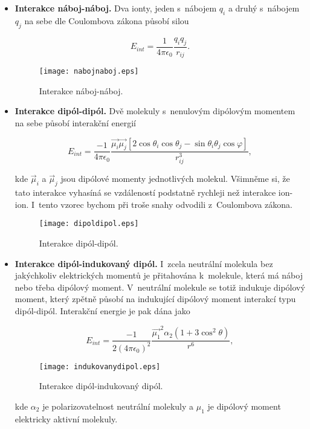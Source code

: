\begin{itemize} 

\item \textbf{Interakce náboj-náboj.} Dva ionty, jeden s~nábojem $q_i$ a druhý s~nábojem $q_j$ na sebe dle Coulombova zákona působí silou

\begin{equation}
E_{int} = \frac{1}{4 \pi \epsilon_0} \frac{q_i q_j}{r_{ij}}.
\label{rov:MS-1}
\end{equation}

\begin{figure} [htb]
\centering
\texttt{[image: nabojnaboj.eps]}
\caption{Interakce náboj-náboj.}
\label{obr:Naboj-Naboj}
\end{figure}

\item \textbf{Interakce dipól-dipól.} Dvě molekuly s~nenulovým dipólovým momentem na sebe působí interakční energií

\begin{equation}
E_{int} = \frac{-1}{4 \pi \epsilon_0} \frac{\vec{\mu_i} \vec{\mu_j} [ 2 \cos \theta_i \cos \theta_j - \sin \theta_i \theta_j \cos \varphi]}{r_{ij}^3},
\label{rov:MS-2}
\end{equation}

\noindent kde $\vec{\mu}_i$ a $\vec{\mu}_j$ jsou dipólové momenty jednotlivých molekul. Všimněme si, že tato interakce vyhasíná se vzdáleností podstatně rychleji než interakce ion-ion. I~tento vzorec bychom při troše snahy odvodili z~Coulombova zákona. 

\begin{figure} [htb]
\centering
\texttt{[image: dipoldipol.eps]}
\caption{Interakce dipól-dipól.}
\label{obr:Dipol-Dipol}
\end{figure}

\item \textbf{Interakce dipól-indukovaný dipól.} I~zcela neutrální molekula bez jakýchkoliv elektrických momentů je přitahována k~molekule, která má náboj nebo třeba dipólový moment. V~neutrální molekule se totiž indukuje dipólový moment, který zpětně působí na indukující dipólový moment interakcí typu dipól-dipól. Interakční energie je pak dána jako


\begin{equation}
E_{int} = \frac{-1}{2(4 \pi \epsilon_0)^2} \frac{\vec{\mu_1}^2 \alpha_2 (1 + 3 \cos^2 \theta)}{r^6},
\label{rov:MS-3}
\end{equation}

\begin{figure} [htb]
\centering
\texttt{[image: indukovanydipol.eps]}
\caption{Interakce dipól-indukovaný dipól.}
\label{obr:IndukovanyDipol}
\end{figure}

\noindent kde $\alpha_2$ je polarizovatelnost neutrální molekuly a $\mu_1$ je dipólový moment elektricky aktivní molekuly. 

\end{itemize}

